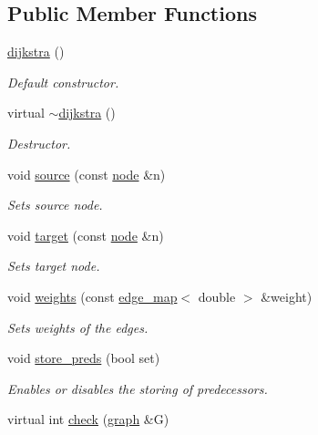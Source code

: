 \subsection*{Public Member Functions}
\begin{DoxyCompactItemize}
\item 
\mbox{\hyperlink{classdijkstra_a64a1fcb9cca32ff932b9b98a08cff106}{dijkstra}} ()
\begin{DoxyCompactList}\small\item\em Default constructor. \end{DoxyCompactList}\item 
virtual \mbox{\hyperlink{classdijkstra_a871e3c8097b7f0bc17358473b1149515}{$\sim$dijkstra}} ()
\begin{DoxyCompactList}\small\item\em Destructor. \end{DoxyCompactList}\item 
void \mbox{\hyperlink{classdijkstra_a9689f2628f76ddb3747ea18c91bd7041}{source}} (const \mbox{\hyperlink{classnode}{node}} \&n)
\begin{DoxyCompactList}\small\item\em Sets source node. \end{DoxyCompactList}\item 
void \mbox{\hyperlink{classdijkstra_a1e9971d767046306574551a461aa2238}{target}} (const \mbox{\hyperlink{classnode}{node}} \&n)
\begin{DoxyCompactList}\small\item\em Sets target node. \end{DoxyCompactList}\item 
void \mbox{\hyperlink{classdijkstra_a92f4394b757f6ffcb372535114a6cbf6}{weights}} (const \mbox{\hyperlink{classedge__map}{edge\+\_\+map}}$<$ double $>$ \&weight)
\begin{DoxyCompactList}\small\item\em Sets weights of the edges. \end{DoxyCompactList}\item 
void \mbox{\hyperlink{classdijkstra_af79383dbbb6b737afcefd8e32350192d}{store\+\_\+preds}} (bool set)
\begin{DoxyCompactList}\small\item\em Enables or disables the storing of predecessors. \end{DoxyCompactList}\item 
virtual int \mbox{\hyperlink{classdijkstra_a51ff4657e0ddb1ca5231a21e6dea1808}{check}} (\mbox{\hyperlink{classgraph}{graph}} \&G)

\end{DoxyCompactItemize}
